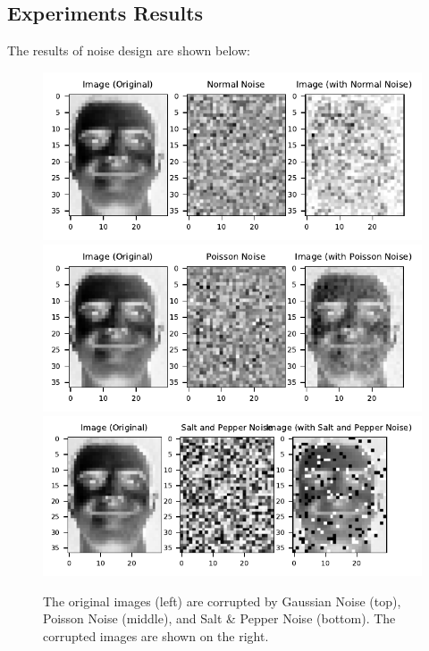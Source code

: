 \subsection{Experiments Results}
The results of noise design are shown below:
\begin{figure}\label{noises}
	\centering
	\includegraphics[scale=.8]{Noise_ORL_Normal_Comparison}\\ %
	\includegraphics[scale=.8]{Noise_ORL_Poisson_Comparison}\\
	\includegraphics[scale=.8]{Noise_ORL_Salt_and_Pepper_Comparison}
	\caption{The original images (left) are corrupted by Gaussian Noise (top), Poisson Noise (middle), and Salt \& Pepper Noise (bottom). The corrupted images are shown on the right.}
	\label{fig:noise}
\end{figure}
